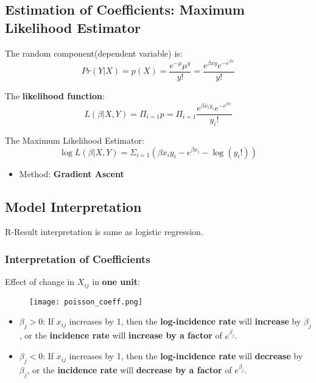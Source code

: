 \subsection{Estimation of Coefficients: Maximum Likelihood Estimator}
The random component(dependent variable) is:
$$Pr(Y|X) = p(X) = \dfrac{e^{-\mu} \mu^y}{y!} = \dfrac{e^{\beta xy} e^{-e^{\beta x}}}{y!}$$

The \textbf{likelihood function}:
$$L(\beta|X,Y) = \Pi_{i=1} p = \Pi_{i=1} \dfrac{e^{\beta x_iy_i} e^{-e^{\beta x}}}{y_i!}$$

The Maximum Likelihood Estimator: 
$$\log L(\beta | X,Y) = \Sigma_{i=1} (\beta x_iy_i - e^{\beta x_i} - \log(y_i!))$$
\begin{itemize}
	\item Method: \textbf{Gradient Ascent}
\end{itemize}
\subsection{Model Interpretation}
R-Result interpretation is same as logistic regression.
\subsubsection{Interpretation of Coefficients}
Effect of change in $X_{ij}$ in \textbf{one unit}:
\begin{figure}[H]
	\centering
	\texttt{[image: poisson\_coeff.png]}
\end{figure}
\begin{itemize}
	\item $\beta_j > 0$: If $x_{ij}$ increases by 1, then the \textbf{log-incidence rate} will \textbf{increase} by $\beta_j$, or the \textbf{incidence rate} will \textbf{increase by a factor} of $e^{\beta_j}$.
	\item $\beta_j < 0$: If $x_{ij}$ increases by 1, then the \textbf{log-incidence rate} will \textbf{decrease} by $\beta_j$, or the \textbf{incidence rate} will \textbf{decrease by a factor} of $e^{\beta_j}$.
\end{itemize}

